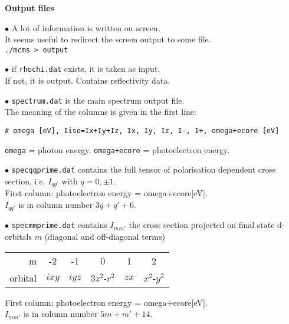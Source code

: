 \documentclass[landscape]{slides}
\begin{document}
\begin{slide}
{\bf Output files}

$\bullet$ A lot of information is written on screen.\\ 
It seems useful to redirect the screen output to some file.\\
{\tt ./mcms > output}

$\bullet$ if {\tt rhochi.dat} exists, it is taken as input.\\
If not, it is output. Contains reflectivity data.

$\bullet$ {\tt spectrum.dat} is the main spectrum output file.\\
The meaning of the columns is given in the first line:
\begin{verbatim}
# omega [eV], Iiso=Ix+Iy+Iz, Ix, Iy, Iz, I-, I+, omega+ecore [eV]
\end{verbatim}
{\tt omega} = photon energy, {\tt omega+ecore} = photoelectron energy.

\end{slide}
\begin{slide}
$\bullet$ {\tt specqqprime.dat} \quad contains the full tensor of
polarisation dependent cross section, i.e. $I_{qq'}$
with $q=0,\pm 1$.\\
First column: photoelectron energy = omega+ecore[eV].\\
$I_{qq'}$ is in column number $3q+q'+6$. 
 

$\bullet$ {\tt specmmprime.dat} \quad contains $I_{mm'}$
the cross section projected on final state d-orbitals $m$ 
(diagonal and off-diagonal terms)
\begin{center}
\begin{tabular}{r|ccccc}
m   & -2 & -1 & 0 & 1 & 2 \\
orbital & $ixy$ & $iyz$ & $3z^2$-$r^2$ & $zx$ & $x^2$-$y^2$\\
\end{tabular}
\end{center}
First column: photoelectron energy = omega+ecore[eV].\\
$I_{mm'}$ is in column number $5m+m'+14$. 


\end{slide}
\end{document}
